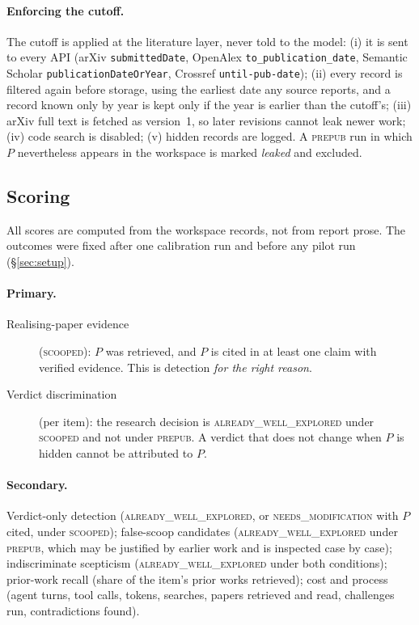 \paragraph{Enforcing the cutoff.} The cutoff is applied at the literature layer, never told to the model: (i) it is sent to every API (arXiv \texttt{submittedDate}, OpenAlex \texttt{to\_publication\_date}, Semantic Scholar \texttt{publicationDateOrYear}, Crossref \texttt{until-pub-date}); (ii) every record is filtered again before storage, using the earliest date any source reports, and a record known only by year is kept only if the year is earlier than the cutoff's; (iii) arXiv full text is fetched as version~1, so later revisions cannot leak newer work; (iv) code search is disabled; (v) hidden records are logged. A \textsc{prepub} run in which $P$ nevertheless appears in the workspace is marked \emph{leaked} and excluded.

\subsection{Scoring}
All scores are computed from the workspace records, not from report prose. The outcomes were fixed after one calibration run and before any pilot run (\S\ref{sec:setup}).
\paragraph{Primary.}
\begin{description}
  \item[Realising-paper evidence] (\textsc{scooped}): $P$ was retrieved, and $P$ is cited in at least one claim with verified evidence. This is detection \emph{for the right reason}.
  \item[Verdict discrimination] (per item): the research decision is \textsc{already\_well\_explored} under \textsc{scooped} and not under \textsc{prepub}. A verdict that does not change when $P$ is hidden cannot be attributed to $P$.
\end{description}
\paragraph{Secondary.} Verdict-only detection (\textsc{already\_well\_explored}, or \textsc{needs\_modification} with $P$ cited, under \textsc{scooped}); false-scoop candidates (\textsc{already\_well\_explored} under \textsc{prepub}, which may be justified by earlier work and is inspected case by case); indiscriminate scepticism (\textsc{already\_well\_explored} under both conditions); prior-work recall (share of the item's prior works retrieved); cost and process (agent turns, tool calls, tokens, searches, papers retrieved and read, challenges run, contradictions found).
